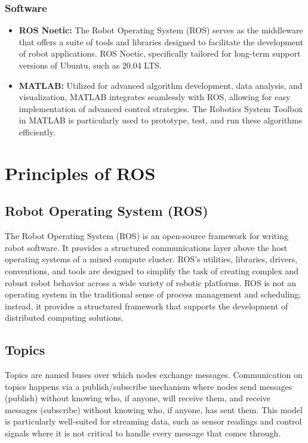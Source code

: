 \documentclass{article}
\begin{document}
	\subsubsection*{Software}
	\begin{itemize}
		\item \textbf{ROS Noetic:} The Robot Operating System (ROS) serves as the middleware that offers a suite of tools and libraries designed to facilitate the development of robot applications. ROS Noetic, specifically tailored for long-term support versions of Ubuntu, such as 20.04 LTS.
		\item \textbf{MATLAB:} Utilized for advanced algorithm development, data analysis, and visualization, MATLAB integrates seamlessly with ROS, allowing for easy implementation of advanced control strategies. The Robotics System Toolbox in MATLAB is particularly used to prototype, test, and run these algorithms efficiently.
	\end{itemize}
	
	\section{Principles of ROS}
	\subsection{Robot Operating System (ROS)}
	The Robot Operating System (ROS) is an open-source framework for writing robot software. It provides a structured communications layer above the host operating systems of a mixed compute cluster. ROS's utilities, libraries, drivers, conventions, and tools are designed to simplify the task of creating complex and robust robot behavior across a wide variety of robotic platforms. ROS is not an operating system in the traditional sense of process management and scheduling; instead, it provides a structured framework that supports the development of distributed computing solutions.
	
	\subsection{Topics}
	Topics are named buses over which nodes exchange messages. Communication on topics happens via a publish/subscribe mechanism where nodes send messages (publish) without knowing who, if anyone, will receive them, and receive messages (subscribe) without knowing who, if anyone, has sent them. This model is particularly well-suited for streaming data, such as sensor readings and control signals where it is not critical to handle every message that comes through.
	
\end{document}
